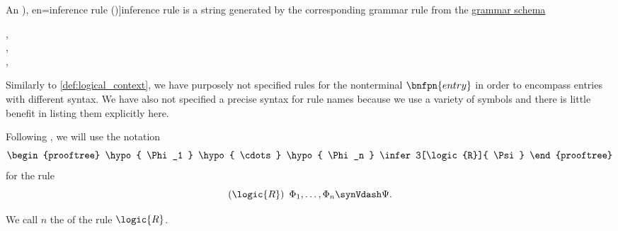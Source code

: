 \begin{definition}\label{def:inference_rule}\mimprovised
  An \term[ru=правило вывода (\cite[def. 1.2.2]{Герасимов2014Вычислимость}), en=inference rule (\cite[2]{MartinLöf1996LogicalLaws})]{inference rule} is a string generated by the corresponding grammar rule from the \hyperref[def:formal_grammar/schema]{grammar schema}
  \begin{bnf*}
         { \bnfor {} \bnfsp \bnftsq{,} \bnfsp {}}, \\
           {\bnfves \bnfor {}}, \\
         {}, \\
     {\bnftsq{(} \bnfsp {} \bnfsp \bnftsq{)} \bnfsp {} \bnfsp \bnftsq{\( \synVdash \)} \bnfsp {}}
  \end{bnf*}

  Similarly to \cref{def:logical_context}, we have purposely not specified rules for the nonterminal \( \bnfpn{entry} \) in order to encompass entries with different syntax. We have also not specified a precise syntax for rule names because we use a variety of symbols and there is little benefit in listing them explicitly here.

  Following \textcite[181]{Gentzen1935LogischeSchließen}, we will use the notation
  \begin{equation*}
    \begin{prooftree}
      \hypo{ \Phi_1 }
      \hypo{ \cdots }
      \hypo{ \Phi_n }
      \infer3[\logic{R}]{ \Psi }
    \end{prooftree}
  \end{equation*}
  for the rule
  \begin{equation*}
    (\logic{R}) \enspace \Phi_1, \ldots, \Phi_n \synVdash \Psi.
  \end{equation*}

  We call \( n \) the  of the rule \( \logic{R} \).
\end{definition}
